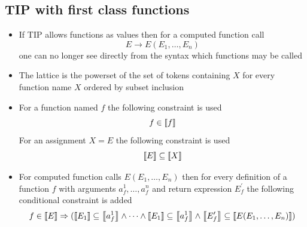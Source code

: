 \subsection{TIP with first class functions}
\begin{itemize}
  \item If TIP allows functions as values then for a computed function call
  \begin{equation*}
    E \to E(E_1, \dots, E_n)
  \end{equation*}
  one can no longer see directly from the syntax which functions may be called
  \item The lattice is the powerset of the set of tokens containing $X$ for every function name $X$ ordered by subset inclusion
  \item For a function named $f$ the following constraint is used
  \begin{equation*}
    f \in \left\llbracket f\right\rrbracket
  \end{equation*}
  For an assignment $X = E$ the following constraint is used
  \begin{equation*}
    \left\llbracket E\right\rrbracket \subseteq \left\llbracket X\right\rrbracket
  \end{equation*}
  \item For computed function calls $E(E_1, \dots, E_n)$ then for every definition of a function $f$ with arguments $a_f^1, \dots, a_f^n$ and return expression $E_f^\prime$ the following conditional constraint is added
  \begin{equation*}
    f \in \left\llbracket E\right\rrbracket \Rightarrow (\left\llbracket E_1\right\rrbracket \subseteq \left\llbracket a_f^1\right\rrbracket \land \cdots \land \left\llbracket E_1\right\rrbracket \subseteq \left\llbracket a_f^1\right\rrbracket \land \left\llbracket E_f^\prime\right\rrbracket \subseteq \left\llbracket E(E_1, \dots, E_n)\right\rrbracket)
  \end{equation*}
\end{itemize}

\newpage
